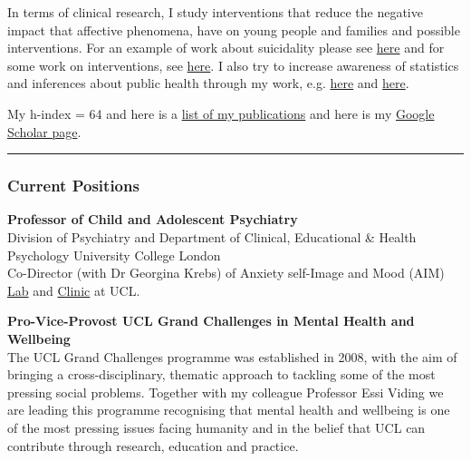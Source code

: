 \documentclass[
]{article}
\begin{document}
In terms of clinical research, I study interventions that reduce the
negative impact that affective phenomena, have on young people and
families and possible interventions. For an example of work about
suicidality please see
\href{https://www.ncbi.nlm.nih.gov/pmc/articles/PMC8016742/}{here} and
for some work on interventions, see
\href{https://www.jaacap.org/article/S0890-8567(19)30349-1/fulltext}{here}.
I also try to increase awareness of statistics and inferences about
public health through my work, e.g.
\href{https://pubmed.ncbi.nlm.nih.gov/37226639/}{here} and
\href{https://www.nature.com/articles/s44220-024-00208-2}{here}.

My h-index = 64 and here is a
\href{https://pubmed.ncbi.nlm.nih.gov/?term=stringaris+a\&sort=date}{list
of my publications} and here is my
\href{https://scholar.google.com/citations?user=9B82424AAAAJ\&hl=en\&oi=ao}{Google
Scholar page}.

\begin{center}\rule{0.5\linewidth}{0.5pt}\end{center}

\hypertarget{current-positions}{%
\subsubsection{Current Positions}\label{current-positions}}

\textbf{Professor of Child and Adolescent Psychiatry}\\
Division of Psychiatry and Department of Clinical, Educational \& Health
Psychology University College London\\
Co-Director (with Dr Georgina Krebs) of Anxiety self-Image and Mood
(AIM)
\href{https://www.ucl.ac.uk/pals/research/clinical-educational-and-health-psychology/research-groups/aim-lab}{Lab}
and
\href{https://www.ucl.ac.uk/university-clinic/about-university-clinic/clinical-services/anxiety-self-image-and-mood-aim-clinic}{Clinic}
at UCL.

\textbf{Pro-Vice-Provost UCL Grand Challenges in Mental Health and
Wellbeing}\\
The UCL Grand Challenges programme was established in 2008, with the aim
of bringing a cross-disciplinary, thematic approach to tackling some of
the most pressing social problems. Together with my colleague Professor
Essi Viding we are leading this programme recognising that mental health
and wellbeing is one of the most pressing issues facing humanity and in
the belief that UCL can contribute through research, education and
practice.
\end{document}
